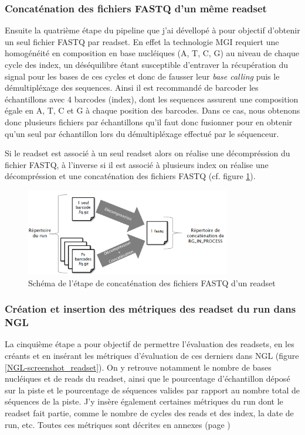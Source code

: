 \subsubsection*{Concaténation des fichiers FASTQ d'un même readset}
Ensuite la quatrième étape du pipeline que j'ai dévellopé à pour objectif d'obtenir un seul fichier FASTQ par readset.
En effet la technologie MGI requiert une homogénéité en composition en base nucléiques (A, T, C, G) au niveau de chaque cycle des index, un déséquilibre étant susceptible d'entraver la récupération du signal pour les bases de ces cycles et donc de fausser leur \emph{base calling} puis le démultipléxage des sequences.
Ainsi il est recommandé de \og barcoder \fg{} les échantillons avec 4 barcodes (index), dont les sequences assurent une composition égale en A, T, C et G à chaque position des barcodes.
Dans ce cas, nous obtenons donc plusieurs fichiers par échantillons qu'il faut donc fusionner pour en obtenir qu'un seul par échantillon lors du démultipléxage effectué par le séquenceur.

Si le readset est associé à un seul readset alors on réalise une décompréssion du fichier FASTQ, à l'inverse si il est associé à plusieurs index on réalise une décompréssion et une concaténation des fichiers FASTQ (cf. figure \ref{schema-concat-fastq}).

\begin{figure}[H]
    \centering
    \includegraphics[width=0.8\textwidth]{img/Schéma_concaténation.png}
    \caption{\footnotesize{Schéma de l'étape de \og concaténation\fg{} des fichiers FASTQ d'un readset}}
    \label{schema-concat-fastq}
\end{figure}

\subsubsection*{Création et insertion des métriques des readset du run dans NGL}
La cinquième étape a pour objectif de permettre l'évaluation des readsets, en les créants et en insérant les métriques d'évaluation de ces derniers dans NGL (figure \ref{NGL-screenshot_readset}).
On y retrouve notamment le nombre de bases nucléiques et de reads du readset, ainsi que le pourcentage d'échantillon déposé sur la piste et le pourcentage de séquences valides par rapport au nombre total de séquences de la piste.
J'y insère également certaines métriques du run dont le readset fait partie, comme le nombre de cycles des reads et des index, la date de run, etc. Toutes ces métriques sont décrites en annexes (page \pageref{anexes3})\\

